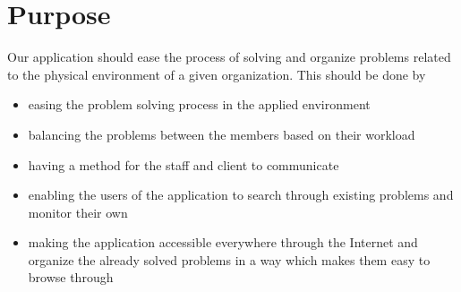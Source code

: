 \section{Purpose}
Our application should ease the process of solving and organize problems related to the physical environment of a given organization. This should be done by
\begin{itemize}
\item easing the problem solving process in the applied environment
\item balancing the problems between the \astaff[] members based on their workload%
\item having a method for the staff and client to communicate
\item enabling the users of the application to search through existing problems and monitor their own
\item making the application accessible everywhere through the Internet and organize the already solved problems in a way which makes them easy to browse through
\end{itemize}
